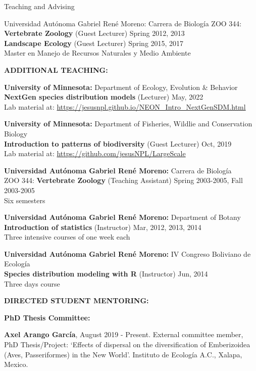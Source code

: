 \documentclass{resume} %
\begin{document}
\begin{rSection}{Teaching and Advising}
\begin{reSubsection}{Universidad Autónoma Gabriel René Moreno: }{Carrera de Biología }{}{
ZOO 344: \textbf{Vertebrate Zoology} (Guest Lecturer) \hfill Spring 2012, 2013 \\ \textbf{Landscape Ecology} (Guest Lecturer) \hfill Spring 2015, 2017 \\
{Master en Manejo de Recursos Naturales y Medio Ambiente} \smallskip 
} 
\end{reSubsection}


\textbf{ADDITIONAL TEACHING:}

{\bf University of Minnesota: }{Department of Ecology, Evolution \& Behavior } \\
\textbf{NextGen species distribution models} (Lecturer) \hfill May, 2022 \\
{Lab material at:
\url{https://jesusnpl.github.io/NEON_Intro_NextGenSDM.html}}\smallskip 

{\bf University of Minnesota: }{Department of Fisheries, Wildlie and Conservation Biology } \\
\textbf{Introduction to patterns of biodiversity} (Guest Lecturer) \hfill Oct, 2019 \\
{Lab material at:
\url{https://github.com/jesusNPL/LargeScale}}\smallskip 

{\bf Universidad Autónoma Gabriel René Moreno: }{Carrera de Biología } \\
ZOO 344: \textbf{Vertebrate Zoology} (Teaching Assistant) \hfill Spring 2003-2005, Fall 2003-2005 \\
{Six semesters}\smallskip 

{\bf Universidad Autónoma Gabriel René Moreno: }{Department of Botany } \\
\textbf{Introduction of statistics} (Instructor) \hfill Mar, 2012, 2013, 2014 \\
{Three intensive courses of one week each}\smallskip 

{\bf Universidad Autónoma Gabriel René Moreno: }{IV Congreso Boliviano de Ecología } \\
\textbf{Species distribution modeling with R} (Instructor) \hfill Jun, 2014 \\
{Three days course}\smallskip 

\textbf{DIRECTED STUDENT MENTORING:}

\textbf{PhD Thesis Committee:}

\textbf{Axel Arango García}, August 2019 - Present. External committee member, PhD Thesis/Project: `Effects of dispersal on the diversification of Emberizoidea (Aves, Passeriformes) in the New World'. Instituto de Ecología A.C., Xalapa, Mexico. 


\end{rSection}
\end{document}
